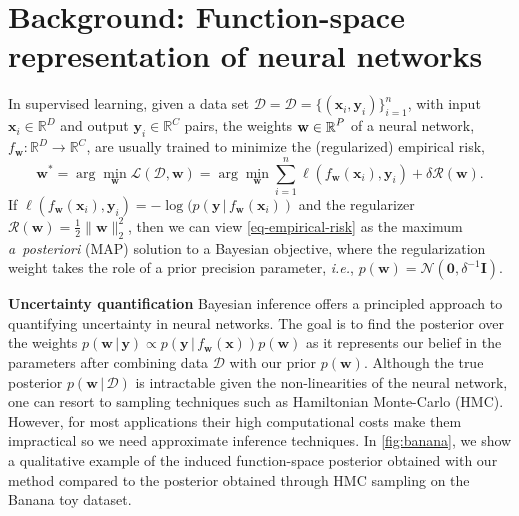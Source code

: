 \documentclass{article}
\makeatletter
\newcommand{\ie}{\textit{i.e.\@}\xspace}
\newcommand{\dataset}{\ensuremath{\mathcal{D}}}
\newcommand{\inputDomain}{\ensuremath{\mathbb{R}^{D}}}
\newcommand{\outputDomain}{\ensuremath{\mathbb{R}^{C}}}
\newcommand{\weights}{\ensuremath{\mathbf{w}}}
\newcommand{\mbf}[1]{\mathbf{#1}}
\renewcommand{\mid}{\,|\,}
\newcommand{\MI}{\mbf{I}}
\newcommand{\vzeros}{\mbf{0}}
\newcommand{\vx}{\mbf{x}}
\newcommand{\vy}{\mbf{y}}
\newcommand{\vw}{\mbf{w}}
\newcommand{\Norm}{\mathcal{N}}
\makeatother
\begin{document}
\section{Background: Function-space representation of neural networks}
\label{sec:methods}
%


In supervised learning, given a data set $\dataset = \dataset = \{(\mathbf{x}_{i} , \mathbf{y}_{i})\}_{i=1}^{n}$, with input $\mathbf{x}_i \in \inputDomain$ and output $\mathbf{y}_i \in \outputDomain$ pairs, the weights $\weights \in \R^{P}$ of a neural network, $f_\mathbf{w} : \inputDomain \to \outputDomain$, are usually trained to minimize the (regularized) empirical risk,
%
\begin{equation} \label{eq-empirical-risk}
  \weights^{*} = 
  \arg \min_{\weights} \mathcal{L}(\dataset,\weights) =
  \arg \min_{\weights} \sum_{i=1}^{n} \ell(f_\weights(\mathbf{x}_{i}), \mathbf{y}_i) + \delta \mathcal{R}(\weights).
\end{equation}
%
If $\ell(f_\weights(\mathbf{x}_{i}), \mathbf{y}_i) = -\log(p(\mathbf{y} \mid f_\weights(\mathbf{x}_{i}))$ and the regularizer $\mathcal{R}(\weights) = \frac{1}{2}\|\weights\|^{2}_2$, then we can view \cref{eq-empirical-risk} as the maximum {\it a~posteriori} (MAP) solution to a Bayesian objective, where the regularization weight takes the role of a prior precision parameter, \ie, $p(\vw) = \Norm(\vzeros, \delta^{-1} \MI)$.

%
%

\textbf{Uncertainty quantification} 
Bayesian inference offers a principled approach to quantifying uncertainty in neural networks.
The goal is to find the posterior over the weights ${p(\vw \mid \vy) \propto p(\vy \mid f_{\weights}(\vx)) p(\weights)}$ as
it represents our belief in the parameters after combining data $\dataset$ with our prior $p(\vw)$.
Although the true posterior $p(\vw \mid \dataset)$ is intractable given the non-linearities of the neural network, one can resort to sampling techniques such as Hamiltonian Monte-Carlo (HMC).
However, for most applications their high computational costs make them impractical so we need approximate inference techniques.
In \cref{fig:banana}, we show a qualitative example of the induced function-space posterior obtained with our method compared to the posterior obtained through HMC sampling on the Banana toy dataset. 
\end{document}
